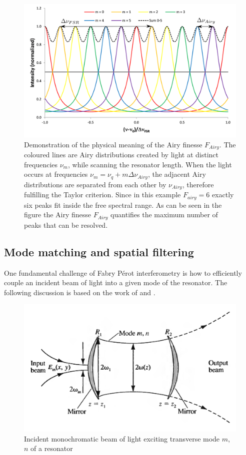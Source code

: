 \begin{figure}[H]
	\centering
	\includegraphics[width=0.8\linewidth]{figures/fabry-perot/Airy_finesse_of_a_Fabry-Perot_interferometer}
	\caption[Demonstration of the physical meaning of the Airy finesse $F_{Airy}$]{Demonstration of the physical meaning of the Airy finesse $F_{Airy}$.
		The coloured lines are Airy distributions created by light at distinct frequencies $\nu_m$, while scanning the resonator length. When the light occurs at frequencies $\nu_m = \nu_q+m\Delta \nu_{Airy}$, the adjacent Airy distributions are separated from each other by $\nu_{Airy}$, therefore fulfilling the Taylor criterion.
		Since in this example $F_{airy}=6$  exactly six peaks fit inside the free spectral range.
		As can be seen in the figure the Airy finesse $F_{Airy}$ quantifies the maximum number of peaks that can be resolved. ~\cite{noauthor_fabryperot_nodate}}
	\label{fig:airyfinesseofafabry-perotinterferometer}
\end{figure}


\subsection{Mode matching and spatial filtering}
\label{subsec:mode-matching-spatial-filtering}
One fundamental challenge of Fabry Pérot interferometry is how to efficiently couple an incident beam of light into a given mode of the resonator.
The following discussion is based on the work of \textcite{yariv_photonics:_2007} and \textcite{meschede_optik_2008}.
\begin{figure}[H]
	\centering
	\includegraphics[width=0.7\linewidth]{figures/fabry-perot/excitation-of-transverse-mode}
	\caption{Incident monochromatic beam of light exciting transverse mode $m$, $n$ of a resonator~\cite{yariv_photonics:_2007}}
	\label{fig:excitation-of-transverse-mode}
\end{figure}

